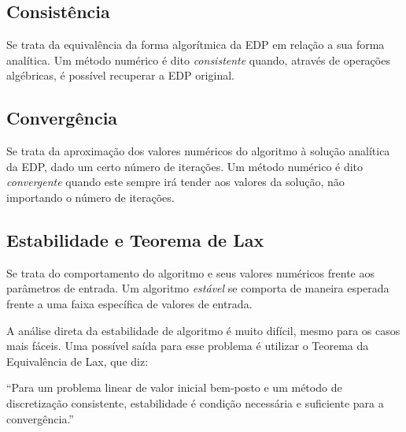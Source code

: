\subsection{Consistência}
Se trata da equivalência da forma algorítmica da EDP em relação a sua forma
analítica. Um método numérico é dito \emph{consistente} quando, através
de operações algébricas, é possível recuperar a EDP original.

\subsection{Convergência}
Se trata da aproximação dos valores numéricos do algoritmo à solução analítica
da EDP, dado um certo número de iterações. Um método numérico é dito
\emph{convergente} quando este sempre irá tender aos valores da solução, não
importando o número de iterações.

\subsection{Estabilidade e Teorema de Lax}
Se trata do comportamento do algoritmo e seus valores numéricos frente aos
parâmetros de entrada. Um algoritmo \emph{estável} se comporta de maneira
esperada frente a uma faixa específica de valores de entrada.

A análise direta da estabilidade de algoritmo é muito difícil, mesmo para os
casos mais fáceis. Uma possível saída para esse problema é utilizar o Teorema
da Equivalência de Lax, que diz:

\begin{displayquote}
    ``Para um problema linear de valor inicial bem-posto e um método de
    discretização consistente, estabilidade é condição necessária e suficiente
    para a convergência.''
\end{displayquote}

